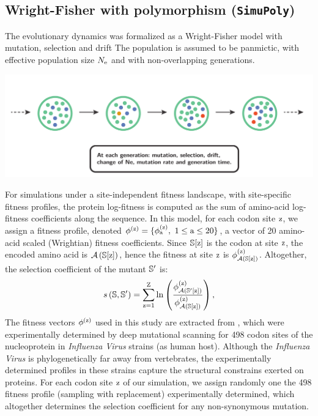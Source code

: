 \documentclass{article}
\begin{document}
	\subsection{Wright-Fisher with polymorphism (\texttt{SimuPoly})}
	\label{subsec:wright-fisher-with-polymorphism}

	The evolutionary dynamics was formalized as a Wright-Fisher model with mutation, selection and drift
	The population is assumed to be panmictic, with {effective population size} $N_{\text{e}}$ and with non-overlapping generations.

	\begin{center}
		\includegraphics[width=\textwidth] {ModelSimuPoly}
	\end{center}

	For simulations under a site-independent fitness landscape, with site-specific fitness profiles, the protein log-fitness is computed as the sum of amino-acid log-fitness coefficients along the sequence.
	In this model, for each {codon} site $\text{z}$, we assign a fitness profile, denoted $\phi^{(\text{z})} = \{ \phi^{(\text{z})}_{\text{a}},\ 1 \leq \text{a} \leq 20 \}$, a vector of 20 amino-acid scaled (Wrightian) fitness coefficients.
	Since $\mathbb{S}[ \text{z} ]$ is the {codon} at site $\text{z}$, the encoded amino acid is $\mathcal{A} \left( \mathbb{S}[ \text{z} ] \right)$, hence the fitness at site $\text{z}$ is $\phi^{(\text{z})}_{\mathcal{A} \left( \mathbb{S}[ \text{z} ] \right)}$.
	Altogether, the selection coefficient of the mutant $\mathbb{S}'$ is:
	\begin{equation}
		s \left( \mathbb{S},\mathbb{S}'\right) = \sum\limits_{\text{z}=1}^{\text{Z}} \ln \left( \dfrac{\phi^{(\text{z})}_{\mathcal{A} \left( \mathbb{S}'[ \text{z} ] \right)}}{\phi^{(\text{z})}_{\mathcal{A} \left( \mathbb{S}[ \text{z} ] \right)}} \right),
	\end{equation}
	The fitness vectors $\phi^{(\text{z})}$ used in this study are extracted from \citet{Bloom2017}, which were experimentally determined by deep mutational scanning for 498 codon sites of the nucleoprotein in \textit{Influenza Virus} strains (as human host).
	Although the \textit{Influenza Virus} is phylogenetically far away from vertebrates, the experimentally determined profiles in these strains capture the structural constrains exerted on proteins.
	For each {codon} site $\text{z}$ of our simulation, we assign randomly one the 498 fitness profile (sampling with replacement) experimentally determined, which altogether determines the selection coefficient for any non-synonymous mutation.
\end{document}
